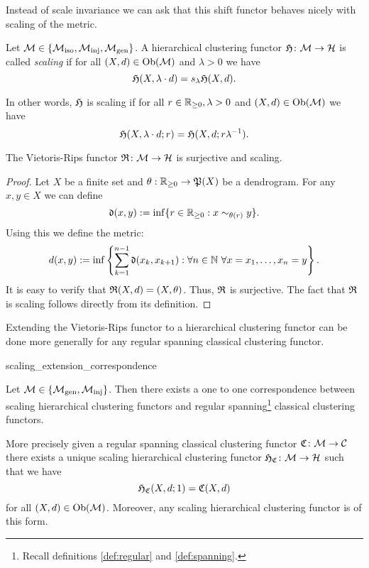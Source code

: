 Instead of scale invariance we can ask that this shift functor behaves nicely with scaling of the metric.

\begin{definition}{}{}
Let $\mathcal{M} \in \{{\mathcal{M}_\mathrm{iso}},{\mathcal{M}_\mathrm{inj}},{\mathcal{M}_\mathrm{gen}}\}$. A hierarchical clustering functor $\mathfrak{H}\colon \mathcal{M} \to \mathcal{H}$ is called \emph{scaling} if for all ${(X,d) \in \mathrm {Ob}(\mathcal{M})}$ and $\lambda > 0$ we have
$$
\mathfrak{H}(X, \lambda \cdot d) = s_\lambda \mathfrak{H}(X,d).
$$
\end{definition}

In other words, $\mathfrak{H}$ is scaling if for all $r \in \mathbb R_{\geq0}, \lambda > 0$ and $(X,d) \in \mathrm {Ob}(\mathcal{M})$ we have
$$
\mathfrak{H}(X, \lambda \cdot d; r) = \mathfrak{H}(X,d; r \lambda^{-1}).
$$

\begin{proposition}{\cite[Sec.~7.3.1]{Carlsson2010}}{}
The Vietoris-Rips functor $\mathfrak{R}\colon \mathcal{M} \to \mathcal{H}$ is surjective and scaling.
\end{proposition}

\begin{proof}
Let $X$ be a finite set and $\theta: \mathbb R_{\geq0} \to \mathfrak{P}(X)$ be a dendrogram. For any $x,y \in X$ we can define
$$
\mathfrak{d}(x,y) := \inf\{r \in \mathbb R_{\geq0}: x \sim_{\theta(r)} y\}.
$$
Using this we define the metric:
$$
d(x,y) := \inf\left\{\sum_{k=1}^{n-1} \mathfrak{d}(x_k, x_{k+1}): \forall n \in \mathbb N \ \forall x = x_1, \dots, x_n = y\right\}.
$$
It is easy to verify that $\mathfrak{R}(X,d) = (X,\theta)$. Thus, $\mathfrak{R}$ is surjective. The fact that $\mathfrak{R}$ is scaling follows directly from its definition.
\end{proof}



Extending the Vietoris-Rips functor to a hierarchical clustering functor can be done more generally for any regular spanning classical clustering functor.
\begin{proposition}{}{scaling_extension_correspondence}

Let $\mathcal{M} \in \{{\mathcal{M}_\mathrm{gen}},{\mathcal{M}_\mathrm{inj}}\}$. Then there exists a one to one correspondence between
scaling hierarchical clustering functors and regular spanning\footnote{Recall definitions \ref{def:regular} and \ref{def:spanning}.} classical clustering functors.

\medskip
More precisely given a regular spanning classical clustering functor $\mathfrak{C}\colon \mathcal{M} \to \mathcal{C}$ there exists a unique scaling hierarchical clustering functor $\mathfrak{H}_{\mathfrak{C}}\colon \mathcal{M} \to \mathcal{H}$ such that we have
$$
\mathfrak{H}_{\mathfrak{C}}(X,d; 1) = \mathfrak{C}(X,d)
$$
for all $(X,d) \in \mathrm {Ob}(\mathcal{M})$.
Moreover, any scaling hierarchical clustering functor is of this form.
\end{proposition}


